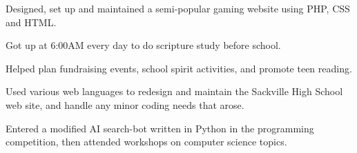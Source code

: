 \documentclass[letterpaper]{resume}
\begin{document}
	\begin{description}
		\item Designed, set up and maintained a semi-popular gaming website using PHP, CSS and HTML.
	\end{description}

	\begin{description}
		\item Got up at 6:00AM every day to do scripture study before school.
	\end{description}

	\begin{description}
		\item Helped plan fundraising events, school spirit activities, and promote teen reading. 
	\end{description}

	\begin{description}
		\item Used various web languages to redesign and maintain the Sackville High School web site, and handle any minor coding needs that arose.
	\end{description}

	\begin{description}
		\item Entered a modified AI search-bot written in Python in the programming competition, then attended workshops on computer science topics.
	\end{description}

\newpage
\end{document}
